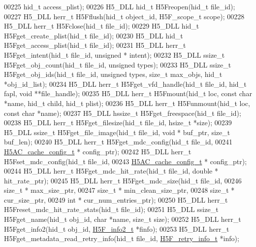 \begin{DoxyCode}
00225                 hid\_t access\_plist);
00226 H5\_DLL hid\_t  H5Freopen(hid\_t file\_id);
00227 H5\_DLL herr\_t H5Fflush(hid\_t object\_id, H5F\_scope\_t scope);
00228 H5\_DLL herr\_t H5Fclose(hid\_t file\_id);
00229 H5\_DLL hid\_t  H5Fget\_create\_plist(hid\_t file\_id);
00230 H5\_DLL hid\_t  H5Fget\_access\_plist(hid\_t file\_id);
00231 H5\_DLL herr\_t H5Fget\_intent(hid\_t file\_id, \textcolor{keywordtype}{unsigned} * intent);
00232 H5\_DLL ssize\_t H5Fget\_obj\_count(hid\_t file\_id, \textcolor{keywordtype}{unsigned} types);
00233 H5\_DLL ssize\_t H5Fget\_obj\_ids(hid\_t file\_id, \textcolor{keywordtype}{unsigned} types, \textcolor{keywordtype}{size\_t} max\_objs, hid\_t *obj\_id\_list);
00234 H5\_DLL herr\_t H5Fget\_vfd\_handle(hid\_t file\_id, hid\_t fapl, \textcolor{keywordtype}{void} **file\_handle);
00235 H5\_DLL herr\_t H5Fmount(hid\_t loc, \textcolor{keyword}{const} \textcolor{keywordtype}{char} *name, hid\_t child, hid\_t plist);
00236 H5\_DLL herr\_t H5Funmount(hid\_t loc, \textcolor{keyword}{const} \textcolor{keywordtype}{char} *name);
00237 H5\_DLL hssize\_t H5Fget\_freespace(hid\_t file\_id);
00238 H5\_DLL herr\_t H5Fget\_filesize(hid\_t file\_id, hsize\_t *size);
00239 H5\_DLL ssize\_t H5Fget\_file\_image(hid\_t file\_id, \textcolor{keywordtype}{void} * buf\_ptr, \textcolor{keywordtype}{size\_t} buf\_len);
00240 H5\_DLL herr\_t H5Fget\_mdc\_config(hid\_t file\_id,
00241                 \hyperlink{struct_h5_a_c__cache__config__t}{H5AC\_cache\_config\_t} * config\_ptr);
00242 H5\_DLL herr\_t H5Fset\_mdc\_config(hid\_t file\_id,
00243                 \hyperlink{struct_h5_a_c__cache__config__t}{H5AC\_cache\_config\_t} * config\_ptr);
00244 H5\_DLL herr\_t H5Fget\_mdc\_hit\_rate(hid\_t file\_id, \textcolor{keywordtype}{double} * hit\_rate\_ptr);
00245 H5\_DLL herr\_t H5Fget\_mdc\_size(hid\_t file\_id,
00246                               \textcolor{keywordtype}{size\_t} * max\_size\_ptr,
00247                               \textcolor{keywordtype}{size\_t} * min\_clean\_size\_ptr,
00248                               \textcolor{keywordtype}{size\_t} * cur\_size\_ptr,
00249                               \textcolor{keywordtype}{int} * cur\_num\_entries\_ptr);
00250 H5\_DLL herr\_t H5Freset\_mdc\_hit\_rate\_stats(hid\_t file\_id);
00251 H5\_DLL ssize\_t H5Fget\_name(hid\_t obj\_id, \textcolor{keywordtype}{char} *name, \textcolor{keywordtype}{size\_t} size);
00252 H5\_DLL herr\_t H5Fget\_info2(hid\_t obj\_id, \hyperlink{struct_h5_f__info2__t}{H5F\_info2\_t} *finfo);
00253 H5\_DLL herr\_t H5Fget\_metadata\_read\_retry\_info(hid\_t file\_id, \hyperlink{struct_h5_f__retry__info__t}{H5F\_retry\_info\_t} *info);

\end{DoxyCode}
